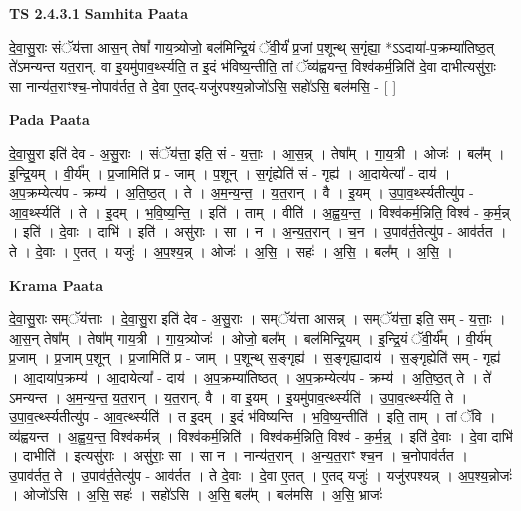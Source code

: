 \documentclass[17pt]{extarticle}
\begin{document}
\textbf{TS 2.4.3.1 } \newline
\textbf{Samhita Paata} \newline

दे॒वा॒सु॒राः संॅय॑त्ता आस॒न् तेषां᳚ गाय॒त्र्योजो॒ बल॑मिन्द्रि॒यं ॅवी॒र्यं॑ प्र॒जां प॒शून्थ् स॒गृंह्या॒ *ऽऽदाया॑-प॒क्रम्या॑तिष्ठ॒त् ते॑ऽमन्यन्त यत॒रान्. वा इ॒यमु॑पाव॒र्थ्स्यति॒ त इ॒दं भ॑विष्य॒न्तीति॒ तां ॅव्य॑ह्वयन्त॒ विश्व॑कर्म॒न्निति॑ दे॒वा दाभीत्यसु॑राः॒ सा नान्य॑त॒राꣳश्च॒-नोपाव॑र्तत॒ ते दे॒वा ए॒तद्-यजु॑रपश्य॒न्नोजो॑ऽसि॒ सहो॑ऽसि॒ बल॑मसि॒ - [  ] \newline

\textbf{Pada Paata} \newline

दे॒वा॒सु॒रा इति॑ देव - अ॒सु॒राः । संॅय॑त्ता॒ इति॒ सं - य॒त्ताः॒ । आ॒स॒न्न् । तेषा᳚म् । गा॒य॒त्री । ओजः॑ । बल᳚म् । इ॒न्द्रि॒यम् । वी॒र्य᳚म् । प्र॒जामिति॑ प्र - जाम् । प॒शून् । स॒गृंह्येति॑ सं - गृह्य॑ । आ॒दायेत्या᳚ - दाय॑ । अ॒प॒क्रम्येत्य॑प - क्रम्य॑ । अ॒ति॒ष्ठ॒त् । ते । अ॒म॒न्य॒न्त॒ । य॒त॒रान् । वै । इ॒यम् । उ॒पा॒व॒र्थ्स्यतीत्यु॑प - आ॒व॒र्थ्स्यति॑ । ते । इ॒दम् । भ॒वि॒ष्य॒न्ति॒ । इति॑ । ताम् । वीति॑ । अ॒ह्व॒य॒न्त॒ । विश्व॑कर्म॒न्निति॒ विश्व॑ - क॒र्म॒न्न् । इति॑ । दे॒वाः । दाभि॑ । इति॑ । असु॑राः । सा । न । अ॒न्य॒त॒रान् । च॒न । उ॒पाव॑र्त॒तेत्यु॑प - आव॑र्तत । ते । दे॒वाः । ए॒तत् । यजुः॑ । अ॒प॒श्य॒न्न् । ओजः॑ । अ॒सि॒ । सहः॑ । अ॒सि॒ । बल᳚म् । अ॒सि॒ ।  \newline


\textbf{Krama Paata} \newline

दे॒वा॒सु॒राः सम्ॅय॑त्ताः । दे॒वा॒सु॒रा इति॑ देव - अ॒सु॒राः । सम्ॅय॑त्ता आसन्न् । सम्ॅय॑त्ता॒ इति॒ सम् - य॒त्ताः॒ । आ॒स॒न् तेषा᳚म् । तेषा᳚म् गाय॒त्री । गा॒य॒त्र्योजः॑ । ओजो॒ बल᳚म् । बल॑मिन्द्रि॒यम् । इ॒न्द्रि॒यं ॅवी॒र्य᳚म् । वी॒र्य॑म् प्र॒जाम् । प्र॒जाम् प॒शून् । प्र॒जामिति॑ प्र - जाम् । प॒शून्थ् स॒ङ्गृह्य॑ । स॒ङ्गृह्या॒दाय॑ । स॒ङ्गृह्येति॑ सम् - गृह्य॑ । आ॒दाया॑प॒क्रम्य॑ । आ॒दायेत्या᳚ - दाय॑ । अ॒प॒क्रम्या॑तिष्ठत् । अ॒प॒क्रम्येत्य॑प - क्रम्य॑ । अ॒ति॒ष्ठ॒त् ते । ते॑ ऽमन्यन्त । अ॒म॒न्य॒न्त॒ य॒त॒रान् । य॒त॒रान्. वै । वा इ॒यम् । इ॒यमु॑पाव॒र्त्थ्स्यति॑ । उ॒पा॒व॒र्त्थ्स्यति॒ ते । उ॒पा॒व॒र्त्थ्स्यतीत्यु॑प - आ॒व॒र्त्थ्स्यति॑ । त इ॒दम् । इ॒दं भ॑विष्यन्ति । भ॒वि॒ष्य॒न्तीति॑ । इति॒ ताम् । तां ॅवि । व्य॑ह्वयन्त । अ॒ह्व॒य॒न्त॒ विश्व॑कर्मन्न् । विश्व॑कर्म॒न्निति॑ । विश्व॑कर्म॒न्निति॒ विश्व॑ - क॒र्म॒न्न्॒ । इति॑ दे॒वाः । दे॒वा दाभि॑ । दाभीति॑ । इत्यसु॑राः । असु॑राः॒ सा । सा न । नान्य॑त॒रान् । अ॒न्य॒त॒राꣳ श्च॒न । च॒नोपाव॑र्तत । उ॒पाव॑र्तत॒ ते । उ॒पाव॑र्त॒तेत्यु॑प - आव॑र्तत । ते दे॒वाः । दे॒वा ए॒तत् । ए॒तद् यजुः॑ । यजु॑रपश्यन्न् । अ॒प॒श्य॒न्नोजः॑ । ओजो॑ऽसि । अ॒सि॒ सहः॑ । सहो॑ऽसि । अ॒सि॒ बल᳚म् । बल॑मसि । अ॒सि॒ भ्राजः॑ \newline
\end{document}

